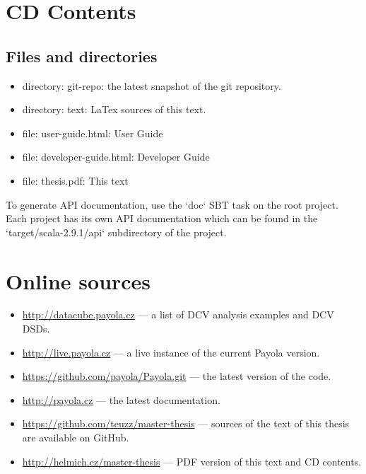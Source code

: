 \appendix
\chapter{CD Contents}

\section{Files and directories}

\begin{itemize}
  \item directory: git-repo: the latest snapshot of the git repository.
  \item directory: text: LaTex sources of this text. 
  \item file: user-guide.html: User Guide
  \item file: developer-guide.html: Developer Guide
  \item file: thesis.pdf: This text
\end{itemize}

To generate API documentation, use the `doc` SBT task on the root project. Each project has its own API documentation which can be found in the `target/scala-2.9.1/api`
subdirectory of the project.

\page
\chapter{Online sources}

\begin{itemize}
  \item \url{http://datacube.payola.cz} --- a list of DCV analysis examples and DCV 
  DSDs.
  \item \url{http://live.payola.cz} --- a live instance of the current Payola 
  version.
  \item \url{https://github.com/payola/Payola.git} --- the latest version of the code. 
  \item \url{http://payola.cz} --- the latest documentation.
  \item \url{https://github.com/teuzz/master-thesis} --- sources of the text of this thesis are available on GitHub.
  \item \url{http://helmich.cz/master-thesis} --- PDF version of this text and 
  CD contents.
\end{itemize}

\page

